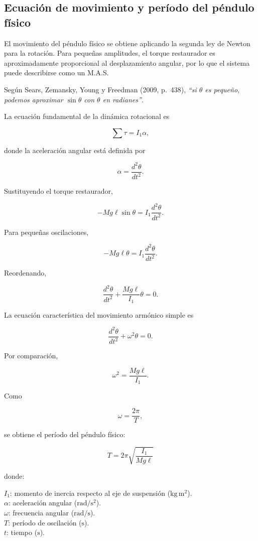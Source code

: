 \documentclass[11pt,a4paper]{article}
\newenvironment{subsectionbody}
{%
    \begin{list}{}{%
        \setlength{\leftmargin}{0.6cm}%
        \setlength{\rightmargin}{0cm}%
        \setlength{\topsep}{0pt}%
        \setlength{\partopsep}{0pt}%
        \setlength{\parsep}{0pt}%
        \setlength{\itemsep}{0pt}%
    }%
    \item\relax
}
{%
    \end{list}
}
\begin{document}
\subsection{Ecuación de movimiento y período del péndulo físico}
\begin{subsectionbody}

El movimiento del péndulo físico se obtiene aplicando la segunda ley
de Newton para la rotación. Para pequeñas amplitudes, el torque
restaurador es aproximadamente proporcional al desplazamiento angular,
por lo que el sistema puede describirse como un M.A.S.

Según Sears, Zemansky, Young y Freedman (2009, p.~438),
\textit{``si $\theta$ es pequeño, podemos aproximar $\sin\theta$ con
$\theta$ en radianes''}.

La ecuación fundamental de la dinámica rotacional es

\[
\sum\tau=I_1\alpha,
\]

donde la aceleración angular está definida por

\[
\alpha=\frac{d^2\theta}{dt^2}.
\]

Sustituyendo el torque restaurador,

\[
-Mg\ell\sin\theta
=
I_1\frac{d^2\theta}{dt^2}.
\]

Para pequeñas oscilaciones,

\[
-Mg\ell\theta
=
I_1\frac{d^2\theta}{dt^2}.
\]

Reordenando,

\[
\frac{d^2\theta}{dt^2}
+
\frac{Mg\ell}{I_1}\theta
=0.
\]

La ecuación característica del movimiento armónico simple es

\[
\frac{d^2\theta}{dt^2}
+
\omega^2\theta
=0.
\]

Por comparación,

\[
\omega^2=\frac{Mg\ell}{I_1}.
\]

Como

\[
\omega=\frac{2\pi}{T},
\]

se obtiene el período del péndulo físico:

\begin{equation}
\boxed{
T=2\pi\sqrt{\frac{I_1}{Mg\ell}}
}
\label{eq:periodo_pendulo_fisico}
\end{equation}

donde:

\hspace*{0.5cm}$I_1$: momento de inercia respecto al eje de suspensión
($\mathrm{kg\,m^2}$).\\
\hspace*{0.5cm}$\alpha$: aceleración angular ($\mathrm{rad/s^2}$).\\
\hspace*{0.5cm}$\omega$: frecuencia angular ($\mathrm{rad/s}$).\\
\hspace*{0.5cm}$T$: período de oscilación ($\mathrm{s}$).\\
\hspace*{0.5cm}$t$: tiempo ($\mathrm{s}$).

\end{subsectionbody}
\end{document}
